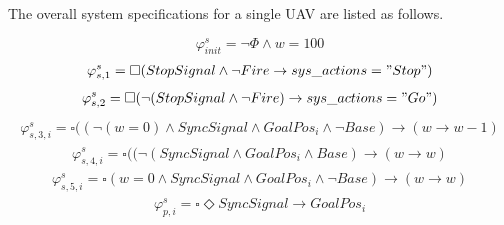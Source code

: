 \documentclass[journal]{IEEEtran}
\newcommand{\always}{\square}
\newcommand{\eventually}{\Diamond}
\begin{document}
The overall system specifications for a single UAV are listed as follows.

\begin{equation}
\varphi_{init}^{s} = \lnot \Phi \land w = 100
\end{equation}
\begin{equation}
\begin{aligned}
\varphi_{s,1}^{s} = \always (StopSignal \land \lnot Fire \rightarrow sys\_actions = "Stop")
\end{aligned}
\end{equation}
\begin{equation}
\begin{aligned}
\varphi_{s,2}^{s} = \always (\lnot ( StopSignal \land \lnot Fire ) \rightarrow sys\_actions = "Go")
\end{aligned}
\end{equation}
\begin{equation}
\begin{aligned}
\varphi_{s,3,i}^{s} = \always ((\lnot ( w = 0 ) \land SyncSignal \land GoalPos_i \land \lnot Base) \rightarrow (w \rightarrow w - 1)
\end{aligned}
\end{equation}
\begin{equation}
\begin{aligned}
\varphi_{s,4,i}^{s} = \always ((\lnot (SyncSignal \land GoalPos_i \land Base) \rightarrow (w \rightarrow w)
\end{aligned}
\end{equation}
\begin{equation}
\begin{aligned}
\varphi_{s,5,i}^{s} = \always ( w = 0 \land SyncSignal \land GoalPos_i \land \lnot Base) \rightarrow (w \rightarrow w )
\end{aligned}
\end{equation}
\begin{equation}
\begin{aligned}
\varphi_{p,i}^{s} = \always \eventually SyncSignal \rightarrow GoalPos_i
\end{aligned}
\end{equation}
\end{document}
